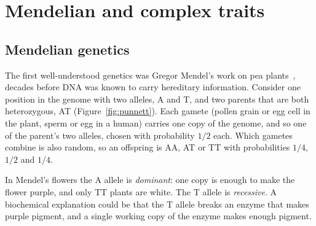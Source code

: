 \section{Mendelian and complex traits}

\subsection{Mendelian genetics}

The first well-understood genetics was Gregor Mendel's work on pea plants~\citep{mendel1866}, decades before DNA was known to carry hereditary information. Consider one position in the genome with two alleles, A and T, and two parents that are both heterozygous, AT (Figure~\ref{fig:punnett}). Each gamete (pollen grain or egg cell in the plant, sperm or egg in a human) carries one copy of the genome, and so one of the parent's two alleles, chosen with probability $1/2$ each. Which gametes combine is also random, so an offspring is AA, AT or TT with probabilities $1/4$, $1/2$ and $1/4$.

In Mendel's flowers the A allele is \emph{dominant}: one copy is enough to make the flower purple, and only TT plants are white. The T allele is \emph{recessive}. A biochemical explanation could be that the T allele breaks an enzyme that makes purple pigment, and a single working copy of the enzyme makes enough pigment.

